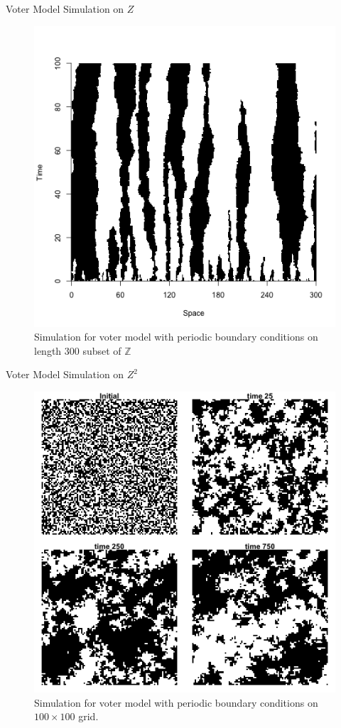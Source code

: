 \documentclass{beamer}
\theoremstyle{definition}
\newcommand{\Z}{\mathbb{Z}}
\begin{document}
\begin{frame}{Voter Model Simulation on $Z$}
\begin{figure}[H]
  \centering
    \includegraphics[width=.6\textwidth]{figures/voter_simulation_1d_300.png}
   \caption{Simulation for voter model with periodic boundary conditions on length 300 subset of $\Z$}
  \label{fig:voter_sim_1d_torus.png}
\end{figure}
\end{frame}

\begin{frame}{Voter Model Simulation on $Z^2$}
\begin{figure}[H]
  \centering
    \includegraphics[width=.6\textwidth]{figures/voter_simulation_torus_100.png}
   \caption{Simulation for voter model with periodic boundary conditions on $100 \times 100$ grid.}
  \label{fig:voter_sim_2d_torus.png}
\end{figure}
\end{frame}
\end{document}
